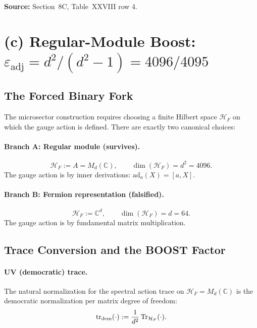 \documentclass[12pt,a4paper]{article}
\begin{document}
\textbf{Source:} Section~8C, Table~XXVIII row 4.

\section{(c) Regular-Module Boost: $\varepsilon_{\mathrm{adj}} = d^2/(d^2-1) = 4096/4095$}
\label{sec:boost}

\subsection{The Forced Binary Fork}

The microsector construction requires choosing a finite Hilbert space
$\mathcal{H}_F$ on which the gauge action is defined. There are exactly
two canonical choices:

\paragraph{Branch A: Regular module (survives).}
\begin{equation}
\mathcal{H}_F := A = M_d(\mathbb{C}), \qquad \dim(\mathcal{H}_F) = d^2 = 4096.
\end{equation}
The gauge action is by inner derivations: $\mathrm{ad}_a(X) = [a, X]$.

\paragraph{Branch B: Fermion representation (falsified).}
\begin{equation}
\mathcal{H}_F := \mathbb{C}^d, \qquad \dim(\mathcal{H}_F) = d = 64.
\end{equation}
The gauge action is by fundamental matrix multiplication.

\subsection{Trace Conversion and the BOOST Factor}

\paragraph{UV (democratic) trace.}
The natural normalization for the spectral action trace on $\mathcal{H}_F = M_d(\mathbb{C})$
is the democratic normalization per matrix degree of freedom:
\begin{equation}
\mathrm{tr}_{\rm dem}(\cdot) := \frac{1}{d^2}\,\mathrm{Tr}_{\mathcal{H}_F}(\cdot).
\end{equation}
\end{document}

